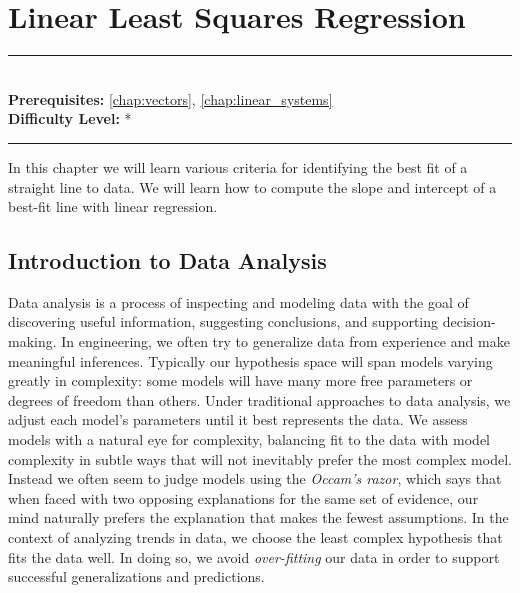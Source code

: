 \documentclass[book.tex]{subfiles}
\begin{document}
\chapter{Linear Least Squares Regression}

\label{chap:linear_regression}
\noindent\rule{11cm}{0.4pt} \\
\textbf{Prerequisites:} \autoref{chap:vectors}, \autoref{chap:linear_systems} \\
\textbf{Difficulty Level:} * \\
\noindent\rule{11cm}{0.4pt}
\vspace{5mm}

In this chapter we will learn various criteria for identifying the best fit of a straight line to data. We will learn how to compute the slope and intercept of a best-fit line with linear regression.

\section{Introduction to Data Analysis}

Data analysis is a process of inspecting and modeling data with the goal of discovering useful information, suggesting conclusions, and supporting decision-making. In engineering, we often try to generalize data from experience and make meaningful inferences. Typically our hypothesis space will span models varying greatly in complexity: some models will have many more free parameters or degrees of freedom than others. Under traditional approaches to data analysis, we adjust each model's parameters until it best represents the data. We assess models with a natural eye for complexity, balancing fit to the data with model complexity in subtle ways that will not inevitably prefer the most complex model. Instead we often seem to judge models using the \textit{Occam's razor}, which says that when faced with two opposing explanations for the same set of evidence, our mind naturally prefers the explanation that makes the fewest assumptions. In the context of analyzing trends in data, we choose the least complex hypothesis that fits the data well. In doing so, we avoid \textit{over-fitting} our data in order to support successful generalizations and predictions.
\end{document}
